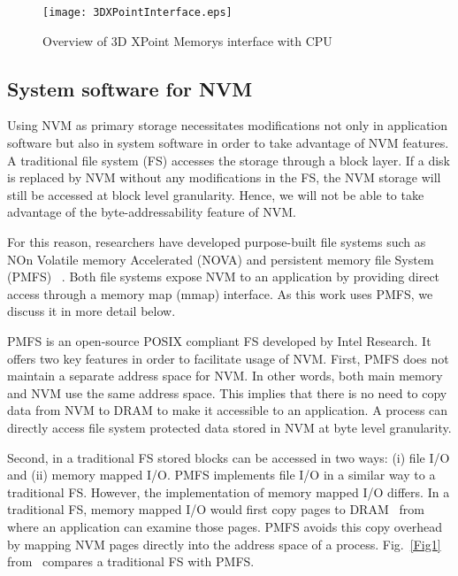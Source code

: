 \begin{figure}
\centering
\texttt{[image: 3DXPointInterface.eps]}
\caption{Overview of 3D XPoint Memory\textquotesingle s interface with CPU}
\label{3DXPointInterface}
\end{figure}

\subsection{System software for NVM}

Using NVM as primary storage necessitates modifications not only in application software but also in system software in order to 
take advantage of NVM features. A traditional file system (FS) accesses the storage through a block layer. If a disk is replaced by NVM without any modifications in
the FS, the NVM storage will still be accessed at block level granularity. Hence, we will not be able to take advantage of the byte-addressability feature of NVM. 

For this reason, researchers have developed purpose-built file systems such as NOn Volatile memory Accelerated (NOVA) \cite{xu2016nova} and persistent memory file System (PMFS) ~\cite{dulloor2014system,githubPMFS}. Both file systems expose NVM to an application by providing direct access through a memory map (mmap) interface. As this work uses PMFS, we discuss it in more detail below.

PMFS is an open-source POSIX compliant FS developed by Intel Research. It offers two key features in order to facilitate usage of NVM.  
First, PMFS does not maintain a separate address space for NVM. In other words, both main memory and NVM use the same address space. This implies that there is no need to copy data from NVM to DRAM to make it accessible to an application. A process can directly access file system protected data stored in NVM at byte level granularity.

Second, in a traditional FS stored blocks can be accessed in two ways: (i) file I/O and (ii) memory mapped I/O. PMFS implements file I/O in a similar way to a traditional FS. However, the implementation of memory mapped I/O differs. In a traditional FS, memory mapped I/O would first copy pages to DRAM~\cite{dulloor2014system} from where an application can examine those pages. PMFS avoids this copy overhead by mapping NVM pages directly into the address space of a process. Fig.~\ref{Fig1} from~\cite{dulloor2014system} compares a traditional FS with PMFS.

